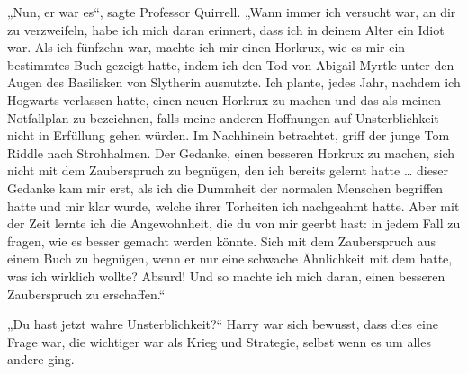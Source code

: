 „Nun, er war es“, sagte Professor Quirrell.
„Wann immer ich versucht war, an dir zu verzweifeln, habe ich mich daran erinnert, dass ich in deinem Alter ein Idiot war. Als ich fünfzehn war, machte ich mir einen Horkrux, wie es mir ein bestimmtes Buch gezeigt hatte, indem ich den Tod von Abigail Myrtle unter den Augen des Basilisken von Slytherin ausnutzte. Ich plante, jedes Jahr, nachdem ich Hogwarts verlassen hatte, einen neuen Horkrux zu machen und das als meinen Notfallplan zu bezeichnen, falls meine anderen Hoffnungen auf Unsterblichkeit nicht in Erfüllung gehen würden. Im Nachhinein betrachtet, griff der junge Tom Riddle nach Strohhalmen. Der Gedanke, einen besseren Horkrux zu machen, sich nicht mit dem Zauberspruch zu begnügen, den ich bereits gelernt hatte … dieser Gedanke kam mir erst, als ich die Dummheit der normalen Menschen begriffen hatte und mir klar wurde, welche ihrer Torheiten ich nachgeahmt hatte. Aber mit der Zeit lernte ich die Angewohnheit, die du von mir geerbt hast: in jedem Fall zu fragen, wie es besser gemacht werden könnte. Sich mit dem Zauberspruch aus einem Buch zu begnügen, wenn er nur eine schwache Ähnlichkeit mit dem hatte, was ich wirklich wollte? Absurd! Und so machte ich mich daran, einen besseren Zauberspruch zu erschaffen.“

„Du hast jetzt wahre Unsterblichkeit?“
Harry war sich bewusst, dass dies eine Frage war, die wichtiger war als Krieg und Strategie, selbst wenn es um alles andere ging.

